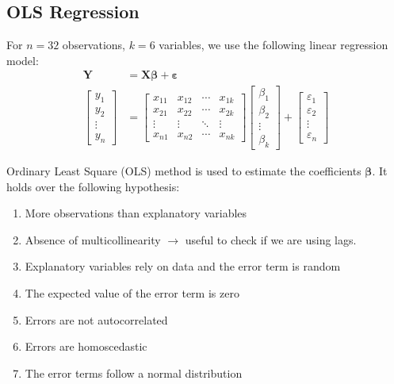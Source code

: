 \subsection{OLS Regression}
For $n = 32$ observations, $k = 6$ variables, we use the following linear regression model:
\begin{align*}
    \boldsymbol{Y} & = \boldsymbol{X} \boldsymbol{\beta} + \boldsymbol{\varepsilon} \\
    \begin{bmatrix} 
        y_1 \\ y_2 \\ \vdots \\ y_n 
        \end{bmatrix} & = \begin{bmatrix}
        x_{11} & x_{12} & \cdots & x_{1k} \\ 
        x_{21} & x_{22} & \cdots & x_{2k} \\ 
        \vdots & \vdots & \ddots & \vdots \\ 
        x_{n1} & x_{n2} & \cdots & x_{nk} 
        \end{bmatrix} \begin{bmatrix}
        \beta_1 \\ \beta_2 \\ \vdots \\ \beta_k 
        \end{bmatrix} + \begin{bmatrix} 
        \varepsilon_1 \\ \varepsilon_2 \\ \vdots \\ \varepsilon_n \end{bmatrix}
\end{align*}

Ordinary Least Square (OLS) method is used to estimate the coefficients $\boldsymbol{\beta}$. It holds over the following hypothesis:
\begin{enumerate}
    \item More observations than explanatory variables
    \item Absence of multicollinearity $\to$ useful to check if we are using lags.
    \item Explanatory variables rely on data and the error term is random
    \item The expected value of the error term is zero
    \item Errors are not autocorrelated
    \item Errors are homoscedastic
    \item The error terms follow a normal distribution
\end{enumerate}

